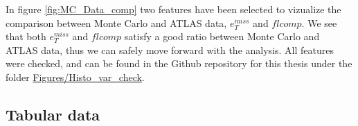 In figure \ref{fig:MC_Data_comp} two features have been selected to vizualize the comparison between Monte Carlo and ATLAS data, $e_T^{miss}$ 
and $flcomp$. We see that both $e_T^{miss}$ and $flcomp$ satisfy a good ratio between Monte Carlo and ATLAS data, thus we can safely 
move forward with the analysis. All features were checked, and can be found in the Github repository for this thesis under the folder 
\href{https://github.com/Gadangadang/MasterThesis/tree/main}{Figures/Histo\_var\_check}.

\par \par
\subsection*{Tabular data}